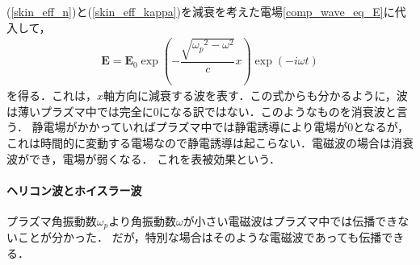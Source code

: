 (\ref{skin_eff_n})と(\ref{skin_eff_kappa})を減衰を考えた電場\eqref{comp_wave_eq_E}に代入して，
\begin{align}
  \boldsymbol{E}=\boldsymbol{E}_0\exp\left(-\dfrac{\sqrt{{{\omega_p}^2-\omega^2}}}{c}x\right)\exp(-i\omega{t})
\end{align}
を得る．これは，$x$軸方向に減衰する波を表す．この式からも分かるように，波は薄いプラズマ中では完全に0になる訳ではない．このようなものを消衰波と言う．
静電場がかかっていればプラズマ中では静電誘導により電場が0となるが，これは時間的に変動する電場なので静電誘導は起こらない．電磁波の場合は消衰波ができ，電場が弱くなる．
これを表被効果という．

\paragraph{ヘリコン波とホイスラー波}
プラズマ角振動数$\omega_p$より角振動数$\omega$が小さい電磁波はプラズマ中では伝播できないことが分かった．
だが，特別な場合はそのような電磁波であっても伝播できる．

